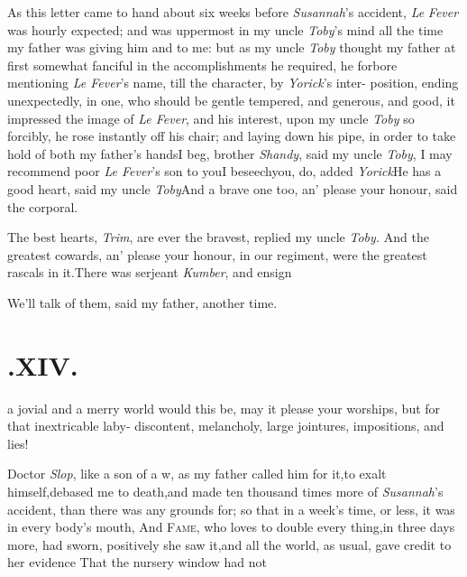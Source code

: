 \documentclass{article}
\begin{document}
As this letter came to hand about six weeks before
\textit{Susannah}’s accident, \textit{Le} \textit{Fever} was hourly
expected; and was uppermost in my uncle \textit{Toby}’s mind
all the time my father was giving him and 
to me: but as my uncle \textit{Toby} thought my father at first somewhat fanciful in the
accomplishments he required, he forbore mentioning \textit{Le
Fever}’s name,\break
\tsh till the character, by \textit{Yorick}’s inter-\break
position, ending unexpectedly, in one,
who should be gentle tempered, and ge\-nerous, and good, it impressed
the image of \textit{Le Fever}, and his interest, upon my\break
uncle
\textit{Toby} so forcibly, he rose instantly off his chair; and
laying down his pipe, in order to take hold of both my
father’s hands\tsh I beg, brother \textit{Shandy},
said my uncle \textit{Toby}, I may recommend poor \textit{Le
Fever}’s son to you\tsk I beseech\break you, do, added
\textit{Yorick}\tsh He has a good heart, said my uncle
\textit{Toby}\tsh And a brave one too, an’ please your
honour, said the corporal.

\tsh The best hearts, \textit{Trim}, are ever the
bravest, replied my uncle \textit{Toby.}\break
\tsh And the greatest cowards, an’ please your honour, in our regiment,
were the greatest rascals in it.\tsk There was serjeant
\textit{Kumber}, and ensign\tsh

\tsh We’ll talk of them, said my father, another
time.

\smallskip

\section{.\enspace XIV.}

 a jovial and a merry world would
this be, may it please your\break 
worships, but for that inextricable laby-\break
{}
discontent, melancholy, large jointures, impositions, and lies!

Doctor \textit{Slop}, like a son of a w\tsk, as\break
my father called him for it,\tsk to exalt\break
himself,\tsk debased me to death,\tsk and\break
made ten thousand times more of
\textit{Susannah}’s accident, than there was any grounds for;
so that in a week’s time, or less, it was in every
body’s mouth,\break
{}
\break
And \textsc{Fame}, who loves to
double every thing,\tsk in three days more, had sworn, positively
she saw it,\tsk and all the world, as usual, gave credit to her
evidence\tsh\break
\lqq That the nursery window had not\break
{}
\stick{\astfill}
\stick{\astfill}
\etp{}
\end{document}
